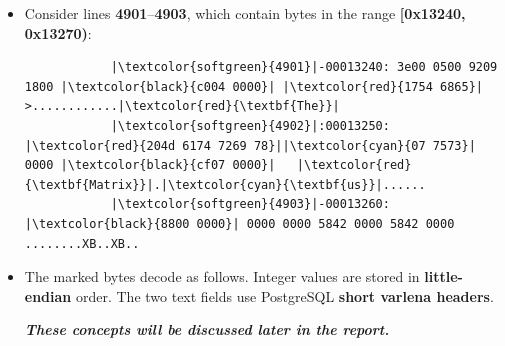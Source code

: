 \documentclass[10pt,a4paper]{article}
\begin{document}
\begin{itemize}
    \item Consider lines \textbf{4901}--\textbf{4903}, which contain bytes in
          the range \textbf{[0x13240, 0x13270)}:
          \begin{verbatim}
            |\textcolor{softgreen}{4901}|-00013240: 3e00 0500 9209 1800 |\textcolor{black}{c004 0000}| |\textcolor{red}{1754 6865}|  >............|\textcolor{red}{\textbf{The}}|
            |\textcolor{softgreen}{4902}|:00013250: |\textcolor{red}{204d 6174 7269 78}||\textcolor{cyan}{07 7573}| 0000 |\textcolor{black}{cf07 0000}|   |\textcolor{red}{\textbf{Matrix}}|.|\textcolor{cyan}{\textbf{us}}|......
            |\textcolor{softgreen}{4903}|-00013260: |\textcolor{black}{8800 0000}| 0000 0000 5842 0000 5842 0000  ........XB..XB..
          \end{verbatim}

    \item The marked bytes decode as follows. Integer values are stored in
          \textbf{little-endian} order. The two text fields use PostgreSQL
          \textbf{short varlena headers}.

          \textbf{\textit{These concepts will be discussed later in the
          report.}}


\end{itemize}
\end{document}
